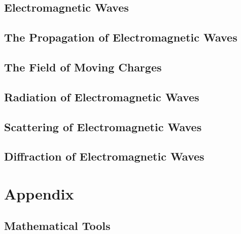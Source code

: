 \documentclass[
    ebook,
    11pt,
    oneside,
    onecolumn,
    openright,
    final
]{memoir}
\begin{document}
\chapter{Electromagnetic Waves}

\chapter{The Propagation of Electromagnetic Waves}

\chapter{The Field of Moving Charges}

\chapter{Radiation of Electromagnetic Waves}

\chapter{Scattering of Electromagnetic Waves}

\chapter{Diffraction of Electromagnetic Waves}

\appendix
\part{Appendix}

\chapter{Mathematical Tools}

\backmatter
\end{document}
